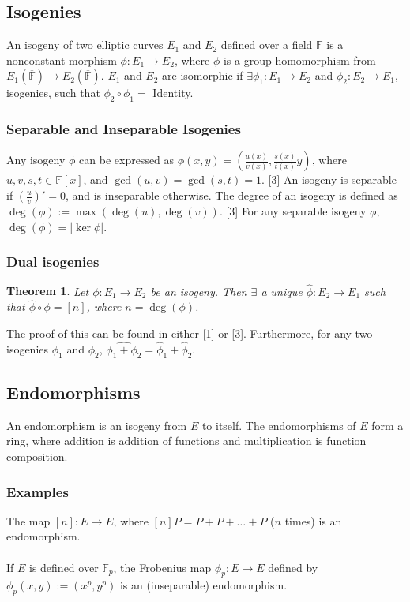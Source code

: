 \documentclass[12pt,twoside]{article}
\newcommand\abs[1]{\left|#1\right|}
\newtheorem{theorem}{Theorem}
\begin{document}
\subsection{Isogenies} 
An isogeny of two elliptic curves $E_1$ and $E_2$ defined over a field $\mathbb F$ is a nonconstant morphism $\phi: E_1 \to E_2$, where $\phi$ is a group homomorphism from $E_1(\overline{\mathbb F}) \to E_2(\overline{\mathbb F})$. $E_1$ and $E_2$ are isomorphic if $\exists \phi_1: E_1 \to E_2$ and $\phi_2: E_2 \to E_1$, isogenies, such that $\phi_2 \circ \phi_1 =  $ Identity.

\subsubsection{Separable and Inseparable Isogenies}
Any isogeny $\phi$ can be expressed as $\phi(x,y) = (\frac{u(x)}{v(x)}, \frac{s(x)}{t(x)}y)$, where $u,v,s,t \in \mathbb F[x]$, and $\gcd(u,v) = \gcd(s,t) = 1$. [3] %
An isogeny is separable if $(\frac{u}{v})' = 0$, and is inseparable otherwise. The degree of an isogeny is defined as $\deg(\phi) := \max(\deg(u), \deg(v))$. [3]
For any separable isogeny $\phi$, $\deg(\phi) = \abs{ \ker \phi}$.

\subsubsection{Dual isogenies}
\begin{theorem}
Let $\phi: E_1 \to E_2$ be an isogeny. Then $\exists$ a unique $\hat{\phi}: E_2 \to E_1$ such that $\hat \phi \circ \phi = [n]$, where $n = \deg(\phi)$.
\end{theorem}
\noindent The proof of this can be found in either [1] or [3]. Furthermore, for any two isogenies $\phi_1$ and $\phi_2$, $\widehat{\phi_1 + \phi_2} = \hat \phi_1 + \hat \phi_2$.
\subsection{Endomorphisms}

An endomorphism is an isogeny from $E$ to itself. The endomorphisms of $E$ form a ring, where addition is addition of functions and multiplication is function composition.

\subsubsection{Examples}

The map $[n]: E \to E$, where $[n]P = P + P + \dots + P$ ($n$ times) is an endomorphism.
\\ \\
\noindent If $E$ is defined over $\mathbb F_p$, the Frobenius map $\phi_p: E \to E$ defined by $\phi_p(x,y) := (x^p, y^p)$ is an (inseparable) endomorphism.
\end{document}
